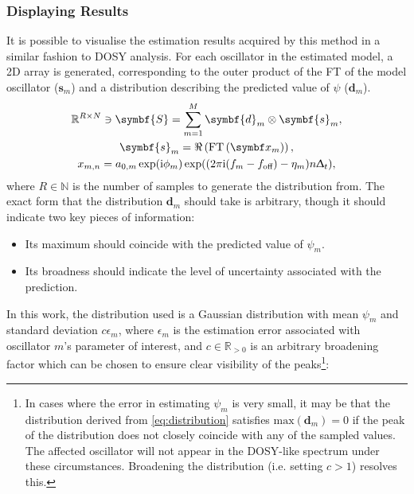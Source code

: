 \subsubsection{Displaying Results}
It is possible to visualise the estimation results acquired by this method in a
similar fashion to \ac{DOSY} analysis. For each oscillator in the estimated
model, a \ac{2D} array is generated, corresponding to the outer product of the
\ac{FT} of the model oscillator ($\symbf{s}_m$) and a distribution describing
the predicted value of $\psi$ ($\symbf{d}_m$).
\begin{subequations}
    \begin{gather}
        \mathbb{R}^{R \times N} \ni \symbf{S} = \sum_{m=1}^{M}
        \symbf{d}_m \otimes
        \symbf{s}_m ,\label{eq:dosy-spectrum}\\
        \symbf{s}_m = \Re\left(\FT\left(\bx_m\right)\right),\\
        x_{m,n} = a_{0,m} \exp(\iu \phi_m)
        \exp((2 \pi \iu (f_m - \foff) - \eta_m ) n \Dt),
    \end{gather}%
    \label{eq:dosy-cross-product}%
\end{subequations}
where $R \in \mathbb{N}$ is the number of samples to generate the distribution from.
The exact form that the distribution $\symbf{d}_m$ should take is arbitrary,
though it should indicate two key pieces of information:
\begin{itemize}
    \item Its maximum should coincide with the predicted value of $\psi_m$.
    \item Its broadness should indicate the level of uncertainty associated
        with the prediction.
\end{itemize}
In this work, the distribution used is a Gaussian distribution with mean
$\psi_m$ and standard deviation $c \epsilon_m$, where $\epsilon_m$ is the
estimation error associated with oscillator $m$'s parameter of interest, and $c
\in \mathbb{R}_{>0}$ is an arbitrary broadening factor which can be chosen to
ensure clear visibility of
the peaks\footnote{
    In cases where the error in estimating $\psi_m$ is very small, it may be
    that the distribution derived from \cref{eq:distribution} satisfies
    $\text{max}(\symbf{d}_m)=0$ if the peak of the distribution does
    not closely coincide with any of the sampled values. The affected
    oscillator will not appear in the \ac{DOSY}-like spectrum under these
    circumstances.
    Broadening the distribution (i.e. setting $c > 1$) resolves this.
}:
